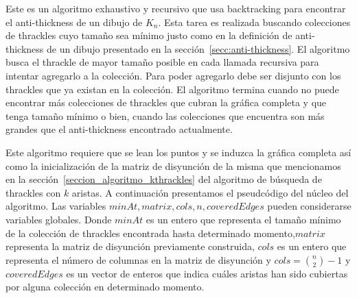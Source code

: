   Este es un algoritmo exhaustivo y recursivo que usa backtracking para encontrar el anti-thickness de un
  dibujo de $K_n$. Esta tarea es realizada buscando colecciones de thrackles cuyo tamaño sea mínimo justo
  como en la definición de anti-thickness de un dibujo presentado en la sección~\ref{secc:anti-thickness}.
  El algoritmo busca el thrackle de mayor tamaño posible en cada llamada recursiva para intentar agregarlo a la colección. Para poder agregarlo debe ser disjunto con los thrackles que ya existan en la colección. El algoritmo termina cuando no puede encontrar más colecciones de thrackles que cubran la gráfica completa y que tenga tamaño mínimo o bien, cuando las colecciones que encuentra son más grandes que el anti-thickness encontrado actualmente.

  Este algoritmo requiere que se lean los puntos y se induzca la gráfica completa así como la inicialización
  de la matriz de disyunción de la misma que mencionamos en la sección~\ref{seccion_algoritmo_kthrackles} del algoritmo de búsqueda de thrackles con $k$ aristas. A continuación presentamos el pseudcódigo del núcleo del algoritmo. Las variables $minAt,matrix,cols,n,coveredEdges$ pueden considerarse variables globales. Donde $minAt$ es un entero que representa el tamaño mínimo de la colección de thrackles encontrada hasta determinado momento,$matrix$ representa la matriz de disyunción previamente construida, $cols$ es un entero que representa el número de columnas en la matriz de disyunción y $cols=\binom{n}{2}-1$ y $coveredEdges$ es un vector de enteros que indica cuáles aristas han sido cubiertas por alguna colección en determinado momento.

